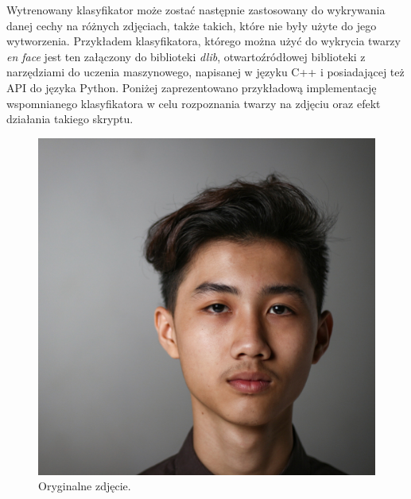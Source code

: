 \documentclass[12pt,a4paper,leqno,oneside,titlepage]{book}
\begin{document}
Wytrenowany klasyfikator może zostać następnie zastosowany do wykrywania danej cechy na różnych zdjęciach, także takich, które nie były użyte do jego wytworzenia. Przykładem klasyfikatora, którego można użyć do wykrycia twarzy \textit{en face} jest ten załączony do biblioteki \textit{dlib}, otwartoźródłowej biblioteki z narzędziami do uczenia maszynowego, napisanej w języku C++ i posiadającej też API do języka Python\cite{dlibPage}. Poniżej zaprezentowano przykładową implementację wspomnianego klasyfikatora w celu rozpoznania twarzy na zdjęciu oraz efekt działania takiego skryptu.



\begin{figure}[!tbp]
  \centering
  \begin{minipage}[b]{0.4\textwidth}
    \includegraphics[width=\textwidth]{pictures/face.jpg}
    \caption{Oryginalne zdjęcie.\cite{Putera}}
  \end{minipage}
  \hfill
  \begin{minipage}[b]{0.4\textwidth}

\end{minipage}
\end{figure}
\end{document}

